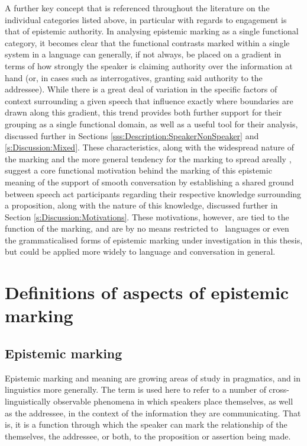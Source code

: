 A further key concept that is referenced throughout the literature on the individual categories listed above, in particular with regards to engagement \cite{EvansBergqvistSanRoque2018a} is that of epistemic authority. In analysing epistemic marking as a single functional category, it becomes clear that the functional contrasts marked within a single system in a language can generally, if not always, be placed on a gradient in terms of how strongly the speaker is claiming authority over the information at hand (or, in cases such as interrogatives, granting said authority to the addressee). While there is a great deal of variation in the specific factors of context surrounding a given speech that influence exactly where boundaries are drawn along this gradient, this trend provides both further support for their grouping as a single functional domain, as well as a useful tool for their analysis, discussed further in Sections \ref{sss:Description:SpeakerNonSpeaker} and \ref{s:Discussion:Mixed}. These characteristics, along with the widespread nature of the marking and the more general tendency for the marking to spread areally \cite{Aikhenvald2004}, suggest a core functional motivation behind the marking of this epistemic meaning of the support of smooth conversation by establishing a shared ground between speech act participants regarding their respective knowledge surrounding a proposition, along with the nature of this knowledge, discussed further in Section \ref{s:Discussion:Motivations}. These motivations, however, are tied to the function of the marking, and are by no means restricted to \lfam\ languages or even the grammaticalised forms of epistemic marking under investigation in this thesis, but could be applied more widely to language and conversation in general.

\section{Definitions of aspects of epistemic marking}\label{s:Intro:EpistemicIntro}
\subsection{Epistemic marking}
Epistemic marking and meaning are growing areas of study in pragmatics, and in linguistics more generally. The term is used here to refer to a number of cross-linguistically observable phenomena in which speakers place themselves, as well as the addressee, in the context of the information they are communicating. That is, it is a function through which the speaker can mark the relationship of the themselves, the addressee, or both, to the proposition or assertion being made. 

